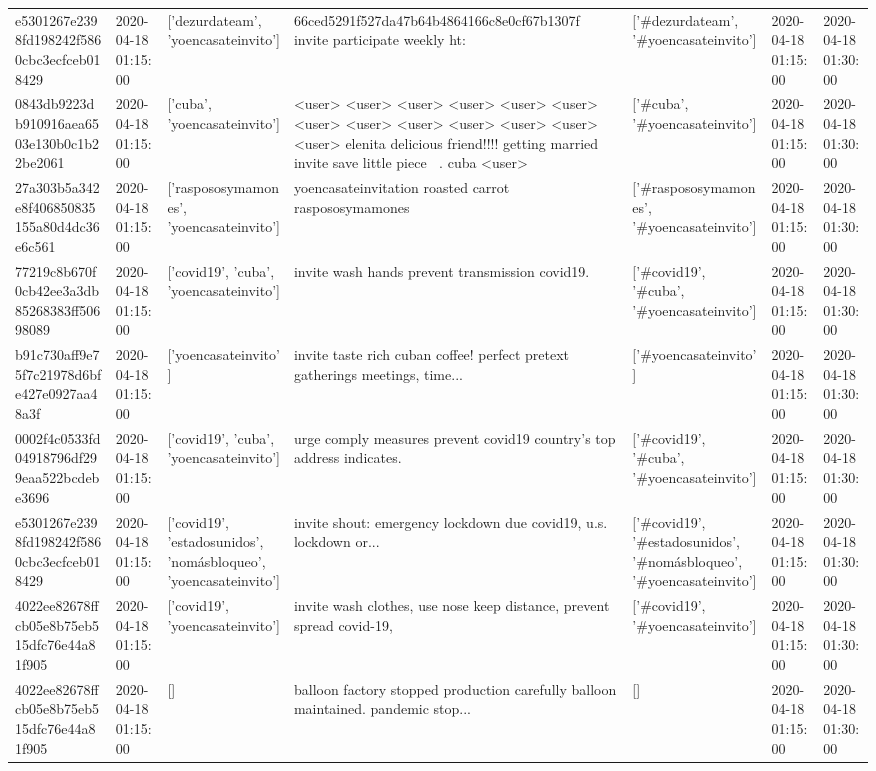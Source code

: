 \begin{tabular}{lllllll}
e5301267e2398fd198242f5860cbc3ecfceb018429 & 2020-04-18 01:15:00 & ['dezurdateam', 'yoencasateinvito'] & 66ced5291f527da47b64b4864166c8e0cf67b1307f invite participate weekly ht: & ['#dezurdateam', '#yoencasateinvito'] & 2020-04-18 01:15:00 & 2020-04-18 01:30:00 \\
0843db9223db910916aea6503e130b0c1b22be2061 & 2020-04-18 01:15:00 & ['cuba', 'yoencasateinvito'] & <user> <user> <user> <user> <user> <user> <user> <user> <user> <user> <user> <user> <user> elenita delicious friend!!!! getting married invite save little piece 🤣🤣. cuba <user> & ['#cuba', '#yoencasateinvito'] & 2020-04-18 01:15:00 & 2020-04-18 01:30:00 \\
27a303b5a342e8f406850835155a80d4dc36e6c561 & 2020-04-18 01:15:00 & ['raspososymamones', 'yoencasateinvito'] & yoencasateinvitation roasted carrot raspososymamones & ['#raspososymamones', '#yoencasateinvito'] & 2020-04-18 01:15:00 & 2020-04-18 01:30:00 \\
77219c8b670f0cb42ee3a3db85268383ff50698089 & 2020-04-18 01:15:00 & ['covid19', 'cuba', 'yoencasateinvito'] & invite wash hands prevent transmission covid19. & ['#covid19', '#cuba', '#yoencasateinvito'] & 2020-04-18 01:15:00 & 2020-04-18 01:30:00 \\
b91c730aff9e75f7c21978d6bfe427e0927aa48a3f & 2020-04-18 01:15:00 & ['yoencasateinvito'] & invite taste rich cuban coffee! perfect pretext gatherings meetings, time... & ['#yoencasateinvito'] & 2020-04-18 01:15:00 & 2020-04-18 01:30:00 \\
0002f4c0533fd04918796df299eaa522bcdebe3696 & 2020-04-18 01:15:00 & ['covid19', 'cuba', 'yoencasateinvito'] & urge comply measures prevent covid19 country's top address indicates. & ['#covid19', '#cuba', '#yoencasateinvito'] & 2020-04-18 01:15:00 & 2020-04-18 01:30:00 \\
e5301267e2398fd198242f5860cbc3ecfceb018429 & 2020-04-18 01:15:00 & ['covid19', 'estadosunidos', 'nomásbloqueo', 'yoencasateinvito'] & invite shout: emergency lockdown due covid19, u.s. lockdown or... & ['#covid19', '#estadosunidos', '#nomásbloqueo', '#yoencasateinvito'] & 2020-04-18 01:15:00 & 2020-04-18 01:30:00 \\
4022ee82678ffcb05e8b75eb515dfc76e44a81f905 & 2020-04-18 01:15:00 & ['covid19', 'yoencasateinvito'] & invite wash clothes, use nose keep distance, prevent spread covid-19, & ['#covid19', '#yoencasateinvito'] & 2020-04-18 01:15:00 & 2020-04-18 01:30:00 \\
4022ee82678ffcb05e8b75eb515dfc76e44a81f905 & 2020-04-18 01:15:00 & [] & balloon factory stopped production carefully balloon maintained. pandemic stop... & [] & 2020-04-18 01:15:00 & 2020-04-18 01:30:00 \\

\end{tabular}
